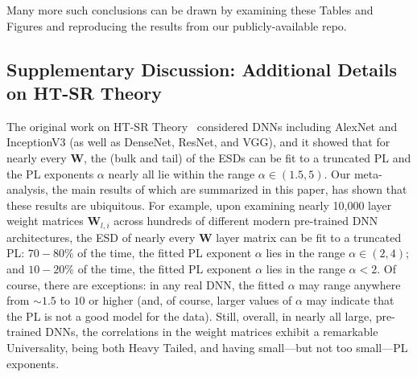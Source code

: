 Many more such conclusions can be drawn by examining these Tables and Figures and reproducing the results from our publicly-available repo.













\subsection{Supplementary Discussion: Additional Details on HT-SR Theory}

The original work on HT-SR Theory~\cite{MM18_TR,MM19_HTSR_ICML,MM20_SDM} considered DNNs including AlexNet and InceptionV3 (as well as DenseNet, ResNet, and VGG), and it showed that for nearly every $\mathbf{W}$, the (bulk and tail) of the ESDs can be fit to a truncated PL and the PL exponents $\alpha$ nearly all lie within the range $\alpha\in(1.5,5)$.
Our meta-analysis, the main results of which are summarized in this paper, has shown that these results are ubiquitous.
For example, 
upon examining nearly 10,000 layer weight matrices $\mathbf{W}_{l,i}$ across hundreds of different modern pre-trained DNN architectures, the ESD of nearly every $\mathbf{W}$ layer matrix can be fit to a truncated PL:
$70-80\%$ of the time, the fitted PL exponent $\alpha$ lies in the range $\alpha\in(2,4)$; and  
$10-20\%$ of the time, the fitted PL exponent $\alpha$ lies in the range $\alpha< 2$.  
Of course, there are exceptions: in any real DNN, the fitted $\alpha$ may range anywhere from $\sim 1.5$ to $10$ or higher (and, of course, larger values of $\alpha$ may indicate that the PL is not a good model for the data).  
Still, overall, in nearly all large, pre-trained DNNs, the correlations in the  weight matrices exhibit a remarkable Universality, being both Heavy Tailed, and having small---but not too small---PL exponents. 

